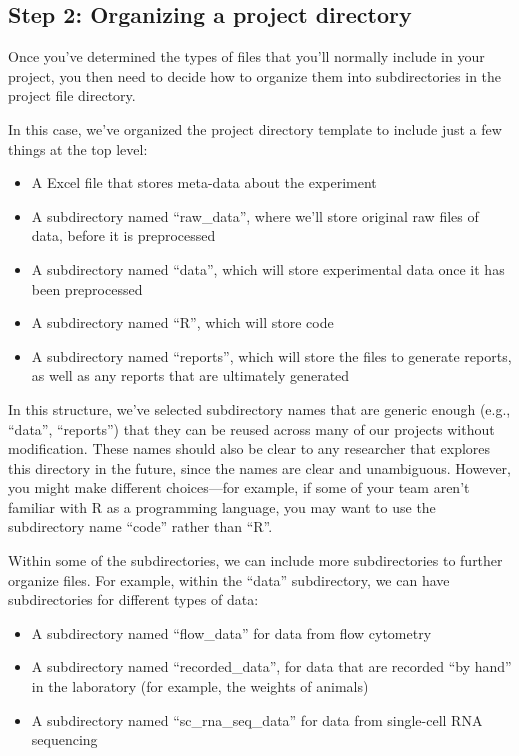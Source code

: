 \documentclass[]{tufte-book}
\providecommand{\tightlist}{%
  \setlength{\itemsep}{0pt}\setlength{\parskip}{0pt}}
\begin{document}
\subsection{Step 2: Organizing a project directory}\label{step-2-organizing-a-project-directory}

Once you've determined the types of files that you'll normally include in your
project, you then need to decide how to organize them into subdirectories in the project
file directory.

In this case, we've organized the project directory template to include just
a few things at the top level:

\begin{itemize}
\tightlist
\item
  A Excel file that stores meta-data about the experiment
\item
  A subdirectory named ``raw\_data'', where we'll store original raw files of
  data, before it is preprocessed
\item
  A subdirectory named ``data'', which will store experimental data once it
  has been preprocessed
\item
  A subdirectory named ``R'', which will store code
\item
  A subdirectory named ``reports'', which will store the files to generate
  reports, as well as any reports that are ultimately generated
\end{itemize}

In this structure, we've selected subdirectory names that are generic enough
(e.g., ``data'', ``reports'') that they can be reused across many of our projects
without modification. These names should also be clear to any researcher that
explores this directory in the future, since the names are clear and
unambiguous. However, you might make different choices---for example, if
some of your team aren't familiar with R as a programming language, you may
want to use the subdirectory name ``code'' rather than ``R''.

Within some of the subdirectories, we can include more subdirectories to
further organize files. For example, within the ``data'' subdirectory, we can
have subdirectories for different types of data:

\begin{itemize}
\tightlist
\item
  A subdirectory named ``flow\_data'' for data from flow cytometry
\item
  A subdirectory named ``recorded\_data'', for data that are recorded ``by hand''
  in the laboratory (for example, the weights of animals)
\item
  A subdirectory named ``sc\_rna\_seq\_data'' for data from single-cell RNA
  sequencing
\end{itemize}
\end{document}
